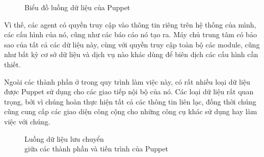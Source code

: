 \begin{figure}[h!]
    \begin{center}
    \end{center}
    \caption{Biểu đồ luồng dữ liệu của Puppet}
    \label{fig:puppet_dataflow}
\end{figure}

Vì thế, các agent có quyền truy cập vào thông tin riêng trên hệ thống của mình, các cấu hình của nó, cũng như các báo cáo nó tạo ra. Máy chủ trung tâm có bảo sao của tất cả các dữ liệu này, cùng với quyền truy cập toàn bộ các module, cũng như bất kỳ cơ sở dữ liệu và dịch vụ nào khác dùng để biên dịch các cấu hình cần thiết.

Ngoài các thành phần ở trong quy trình làm việc này, có rất nhiều loại dữ liệu được Puppet sử dụng cho các giao tiếp nội bộ của nó. Các loại dữ liệu rất quan trọng, bởi vì chúng hoàn thực hiện tất cả các thông tin liên lạc, đồng thời chúng cũng cung cấp các giao diện công cộng cho những công cụ khác sử dụng hay làm việc với chúng.

\newpage
\clearpage

\begin{figure}[h!]
    \begin{center}
    \end{center}
    \caption{Luồng dữ liệu lưu chuyển \\ giữa các thành phần và tiến trình của Puppet}
    \label{fig:puppet_timing_diagram}
\end{figure}

